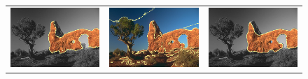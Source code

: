 \documentclass[smallextended]{svjour3}       %
\begin{document}
{{\begin{figure}[hp!]
\begin{tabular}{ccc}
		\includegraphics[scale=0.2]{images/segmentation/bc/rock/gc-seg.png} &
		\includegraphics[scale=0.2]{images/segmentation/schoenemann/rock/rock-seg.png} &
		\includegraphics[scale=0.2]{images/segmentation/bc/rock/corrected-seg.png} \\		

\end{tabular}
\end{figure}}}
\end{document}
